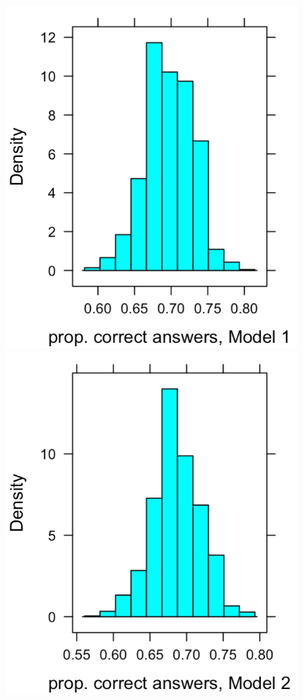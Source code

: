 \begin{figure}[h]
    \centering
    \includegraphics[scale=.45]{histplot_propcorrect1.png}
    \includegraphics[scale=.45]{histplot_propcorrect2.png}

\end{figure}
